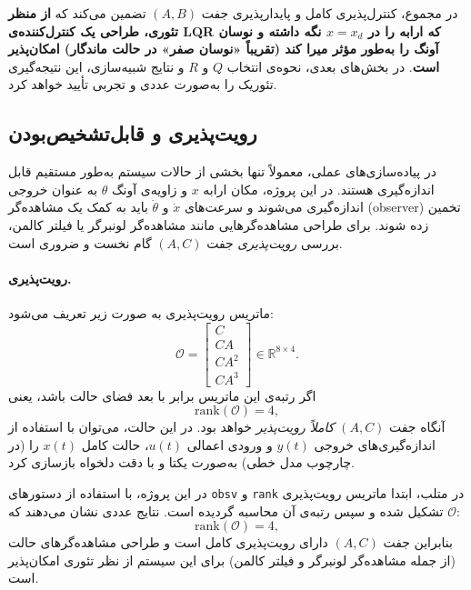 \documentclass[a4paper,12pt]{article}
\begin{document}
در مجموع، کنترل‌پذیری کامل و پایدارپذیری جفت $(A,B)$ تضمین می‌کند که
\textbf{از منظر تئوری، طراحی یک کنترل‌کننده‌ی LQR که ارابه را در $x = x_d$ نگه داشته و نوسان آونگ را به‌طور مؤثر میرا کند (تقریباً «نوسان صفر» در حالت ماندگار) امکان‌پذیر است}.
در بخش‌های بعدی، نحوه‌ی انتخاب $Q$ و $R$ و نتایج شبیه‌سازی، این نتیجه‌گیری تئوریک را به‌صورت عددی و تجربی تأیید خواهد کرد.

\subsection{رویت‌پذیری و قابل‌تشخیص‌بودن}
\label{subsec:observability_detectability}

در پیاده‌سازی‌های عملی، معمولاً تنها بخشی از حالات سیستم به‌طور مستقیم قابل اندازه‌گیری هستند.
در این پروژه، مکان ارابه $x$ و زاویه‌ی آونگ $\theta$ به عنوان خروجی اندازه‌گیری می‌شوند
و سرعت‌های $\dot{x}$ و $\dot{\theta}$ باید به کمک یک مشاهده‌گر (observer) تخمین زده شوند.
برای طراحی مشاهده‌گرهایی مانند مشاهده‌گر لونبرگر یا فیلتر کالمن،
بررسی \emph{رویت‌پذیری} جفت $(A,C)$ گام نخست و ضروری است.

\paragraph{رویت‌پذیری.}
ماتریس رویت‌پذیری به صورت زیر تعریف می‌شود:
\begin{equation}
    \mathcal{O} =
    \begin{bmatrix}
        C     \\
        C A   \\
        C A^2 \\
        C A^3
    \end{bmatrix}
    \in \mathbb{R}^{8\times 4}.
\end{equation}
اگر رتبه‌ی این ماتریس برابر با بعد فضای حالت باشد، یعنی
\[
    \mathrm{rank}(\mathcal{O}) = 4,
\]
آنگاه جفت $(A,C)$ \emph{کاملاً رویت‌پذیر} خواهد بود.
در این حالت، می‌توان با استفاده از اندازه‌گیری‌های خروجی $y(t)$
و ورودی اعمالی $u(t)$، حالت کامل $x(t)$ را (در چارچوب مدل خطی)
به‌صورت یکتا و با دقت دلخواه بازسازی کرد.

در این پروژه، با استفاده از دستورهای \texttt{obsv} و \texttt{rank} در متلب،
ابتدا ماتریس رویت‌پذیری $\mathcal{O}$ تشکیل شده و سپس رتبه‌ی آن محاسبه گردیده است.
نتایج عددی نشان می‌دهند که:
\[
    \mathrm{rank}(\mathcal{O}) = 4,
\]
بنابراین جفت $(A,C)$ دارای رویت‌پذیری کامل است
و طراحی مشاهده‌گرهای حالت (از جمله مشاهده‌گر لونبرگر و فیلتر کالمن)
برای این سیستم از نظر تئوری امکان‌پذیر است.
\end{document}
